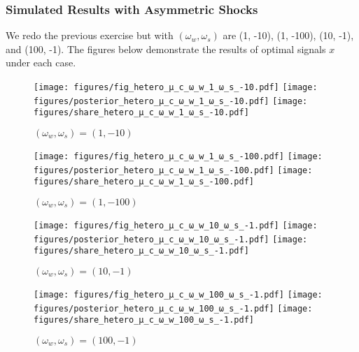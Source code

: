 \documentclass[12pt,a4paper]{article}
\begin{document}
\subsubsection{Simulated Results with Asymmetric Shocks}
We redo the previous exercise but with $(\omega_w,\omega_s)$ are (1, -10), (1, -100), (10, -1), and (100, -1). The figures below demonstrate the results of optimal signals $x$ under each case.
\begin{figure}[htp!]
\caption{$(\omega_w,\omega_s)=(1, -10)$}
\centering
\texttt{[image: figures/fig\_hetero\_μ\_c\_ω\_w\_1\_ω\_s\_-10.pdf]}
\texttt{[image: figures/posterior\_hetero\_μ\_c\_ω\_w\_1\_ω\_s\_-10.pdf]}
\texttt{[image: figures/share\_hetero\_μ\_c\_ω\_w\_1\_ω\_s\_-10.pdf]}
\end{figure}
\begin{figure}[htp!]
\caption{$(\omega_w,\omega_s)=(1, -100)$}
\centering
\texttt{[image: figures/fig\_hetero\_μ\_c\_ω\_w\_1\_ω\_s\_-100.pdf]}
\texttt{[image: figures/posterior\_hetero\_μ\_c\_ω\_w\_1\_ω\_s\_-100.pdf]}
\texttt{[image: figures/share\_hetero\_μ\_c\_ω\_w\_1\_ω\_s\_-100.pdf]}
\end{figure}
\begin{figure}[htp!]
\caption{$(\omega_w,\omega_s)=(10, -1)$}
\centering
\texttt{[image: figures/fig\_hetero\_μ\_c\_ω\_w\_10\_ω\_s\_-1.pdf]}
\texttt{[image: figures/posterior\_hetero\_μ\_c\_ω\_w\_10\_ω\_s\_-1.pdf]}
\texttt{[image: figures/share\_hetero\_μ\_c\_ω\_w\_10\_ω\_s\_-1.pdf]}
\end{figure}
\begin{figure}[htp!]
\caption{$(\omega_w,\omega_s)=(100, -1)$}
\centering
\texttt{[image: figures/fig\_hetero\_μ\_c\_ω\_w\_100\_ω\_s\_-1.pdf]}
\texttt{[image: figures/posterior\_hetero\_μ\_c\_ω\_w\_100\_ω\_s\_-1.pdf]}
\texttt{[image: figures/share\_hetero\_μ\_c\_ω\_w\_100\_ω\_s\_-1.pdf]}
\end{figure}
\end{document}
